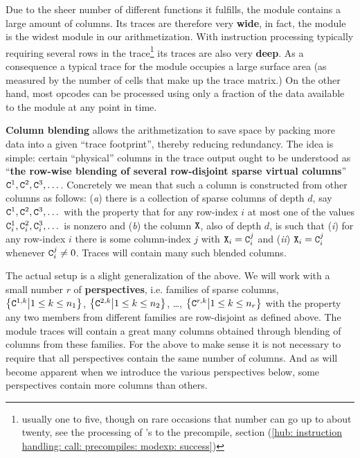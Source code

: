 Due to the sheer number of different functions it fulfills, the \hubMod{} module contains a large amount of columns.
Its traces are therefore very \textbf{wide}, in fact, the \hubMod{} module is the widest module in our arithmetization.
With instruction processing typically requiring several rows in the \hubMod{} trace\footnote{usually one to five, though on rare occasions that number can go up to about twenty, see the processing of 's to the \instModexp{} precompile, section (\ref{hub: instruction handling: call: precompiles: modexp: success})} its traces are also very \textbf{deep}.
As a consequence a typical trace for the \hubMod{} module occupies a large surface area (as measured by the number of cells that make up the trace matrix.)
On the other hand, most opcodes can be processed using only a fraction of the data available to the \hubMod{} module at any point in time.

\textbf{Column blending} allows the arithmetization to save space by packing more data into a given ``trace footprint'', thereby reducing redundancy.
The idea is simple: certain ``physical'' columns  in the trace output ought to be understood as ``\textbf{the row-wise blending of several row-disjoint sparse virtual columns}'' $\texttt{C}^1, \texttt{C}^2, \texttt{C}^3, \dots{}$.
Concretely we mean that such a column  is constructed from other columns as follows:
(\emph{a}) there is a collection of sparse columns of depth $d$, say $\texttt{C}^1, \texttt{C}^2, \texttt{C}^3, \dots{}$ with the property that for any row-index $i$ at most one of the values $\texttt{C}^1_{i}, \texttt{C}^2_{i}, \texttt{C}^3_{i}, \dots{}$ is nonzero and
(\emph{b}) the column $\texttt{X}$, also of depth $d$, is such that
(\emph{i})  for any row-index $i$ there is some column-index $j$ with $\texttt{X}_{i} = \texttt{C}^{j}_{i}$ and
(\emph{ii}) $\texttt{X}_{i} = \texttt{C}^{j}_{i}$ whenever $\texttt{C}^{j}_{i} \neq 0$.
Traces will contain many such blended columns.

The actual setup is a slight generalization of the above.
We will work with a small number $r$ of \textbf{perspectives}, i.e. families of sparse columns,
$\big \{ \texttt{C}^{1, k} \big| 1\leq k \leq n_{1}\big \}$,
$\big \{ \texttt{C}^{2, k} \big| 1\leq k \leq n_{2}\big \}$,
\dots,
$\big \{ \texttt{C}^{r, k} \big| 1\leq k \leq n_{r}\big \}$
with the property any two members from different families are row-disjoint as defined above.
The \hubMod{} module traces will contain a great many columns obtained through blending of columns from these families.
\saNote{} For the above to make sense it is not necessary to require that all perspectives contain the same number of columns.
And as will become apparent when we introduce the various perspectives below, some perspectives contain more columns than others.

